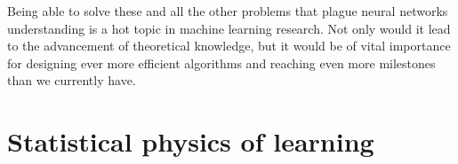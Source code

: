 Being able to solve these and all the other problems that plague neural networks understanding is a hot topic in machine learning research. Not only would it lead to the advancement of theoretical knowledge, but it would be of vital importance for designing ever more efficient algorithms and reaching even more milestones than we currently have.
\section{Statistical physics of learning}

